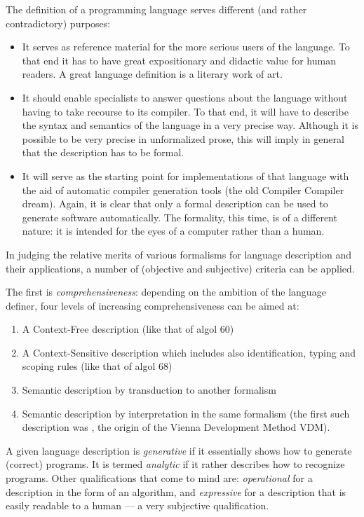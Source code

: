 The definition of a programming language serves different
(and rather contradictory) purposes:
\begin{itemize}
\item It serves as reference material for the more serious users of the
language. To that end it has to have great expositionary and didactic
value for human readers. A great language definition is a literary
work of art.
\item It should enable specialists to answer questions about the
language without having to take recourse to its compiler.
To that end, it will have to describe the syntax and semantics of the
language in a very precise way.
Although it is possible to be very precise in unformalized prose,
this will imply in general that the description has to be formal.
\item It will serve as the starting point for implementations of that
language with the aid of automatic compiler generation tools (the old
Compiler Compiler dream).
Again, it is clear that only a formal description can be used to generate
software automatically. The formality, this time, is of a different nature:
it is intended for the eyes of a computer rather than a human.
\end{itemize}

In judging the relative merits of various formalisms for language
description and their applications, a number of (objective and subjective)
criteria can be applied.

The first is {\em comprehensiveness}: depending on the ambition of the
language definer, four levels of increasing comprehensiveness
can be aimed at:
\begin{enumerate}
\item A Context-Free description (like that of {\sc algol 60})
\item A Context-Sensitive description which includes also identification,
typing and scoping rules (like that of {\sc algol 68})
\item Semantic description by transduction to another formalism
\item Semantic description by interpretation in the same formalism
(the first such description was \cite{pl1:def}, the origin of the
Vienna Development Method VDM).
\end{enumerate}

A given language description is {\em generative} if it essentially
shows how to generate (correct) programs. It is termed
{\em analytic} if it rather describes how to recognize programs.
Other qualifications that come to mind are: {\em operational} for a
description in the form of an algorithm, and {\em expressive} for
a description that is easily readable to a human --- a very subjective
qualification.

